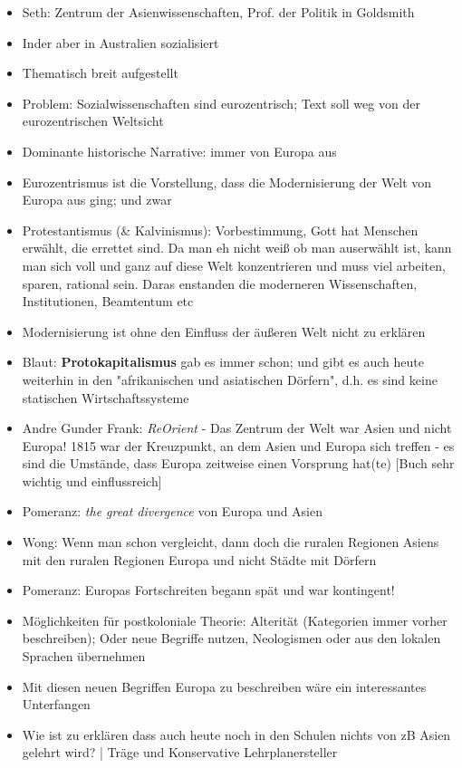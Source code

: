\documentclass[emulatestandardclasses]{scrartcl}
\begin{document}
\begin{itemize}
  \item Seth: Zentrum der Asienwissenschaften, Prof. der Politik in Goldsmith
  \item Inder aber in Australien sozialisiert
  \item Thematisch breit aufgestellt
  \item Problem: Sozialwissenschaften sind eurozentrisch; Text soll weg von der eurozentrischen Weltsicht
  \item Dominante historische Narrative: immer von Europa aus
  \item Eurozentrismus ist die Vorstellung, dass die Modernisierung der Welt von Europa aus ging; und zwar 
  \item Protestantismus (\& Kalvinismus): Vorbestimmung, Gott hat Menschen erwählt, die errettet sind. Da man eh nicht weiß ob man auserwählt ist, kann man sich voll und ganz auf diese Welt konzentrieren und muss viel arbeiten, sparen, rational sein. Daras enstanden die moderneren Wissenschaften, Institutionen, Beamtentum etc
  \item Modernisierung ist ohne den Einfluss der äußeren Welt nicht zu erklären
  \item Blaut: \textbf{Protokapitalismus} gab es immer schon; und gibt es auch heute weiterhin in den "afrikanischen und asiatischen Dörfern", d.h. es sind keine statischen Wirtschaftssysteme 
  \item Andre Gunder Frank: \emph{ReOrient} - Das Zentrum der Welt war Asien und nicht Europa! 1815 war der Kreuzpunkt, an dem Asien und Europa sich treffen - es sind die Umstände, dass Europa zeitweise einen Vorsprung hat(te) [Buch sehr wichtig und einflussreich]
  \item Pomeranz: \emph{the great divergence} von Europa und Asien
  \item Wong: Wenn man schon vergleicht, dann doch die ruralen Regionen Asiens mit den ruralen Regionen Europa und nicht Städte mit Dörfern
  \item Pomeranz: Europas Fortschreiten begann spät und war kontingent!
  \item Möglichkeiten für postkoloniale Theorie: Alterität (Kategorien immer vorher beschreiben); Oder neue Begriffe nutzen, Neologismen oder aus den lokalen Sprachen übernehmen 
  \item Mit diesen neuen Begriffen Europa zu beschreiben wäre ein interessantes Unterfangen
  \item Wie ist zu erklären dass auch heute noch in den Schulen nichts von zB Asien gelehrt wird? | Träge und Konservative Lehrplanersteller
\end{itemize}
\end{document}
